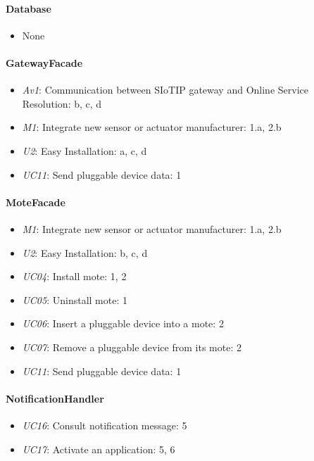    \paragraph{Database}
        \begin{itemize}
          	\item None
        \end{itemize}

    \paragraph{GatewayFacade}
        \begin{itemize}
            \item \emph{Av1}: Communication between SIoTIP gateway and Online Service \\
                               Resolution: b, c, d
            \item \emph{M1}: Integrate new sensor or actuator manufacturer: 1.a, 2.b
            \item \emph{U2}: Easy Installation: a, c, d
            \item \emph{UC11}: Send pluggable device data: 1
        \end{itemize}

    \paragraph{MoteFacade}
        \begin{itemize}
            \item \emph{M1}: Integrate new sensor or actuator manufacturer: 1.a, 2.b
            \item \emph{U2}: Easy Installation: b, c, d
            \item \emph{UC04}: Install mote: 1, 2
            \item \emph{UC05}: Uninstall mote: 1
            \item \emph{UC06}: Insert a pluggable device into a mote: 2
            \item \emph{UC07}: Remove a pluggable device from its mote: 2
            \item \emph{UC11}: Send pluggable device data: 1
        \end{itemize}

    \paragraph{NotificationHandler}
        \begin{itemize}
            \item \emph{UC16}: Consult notification message: 5
            \item \emph{UC17}: Activate an application: 5, 6
        \end{itemize}

